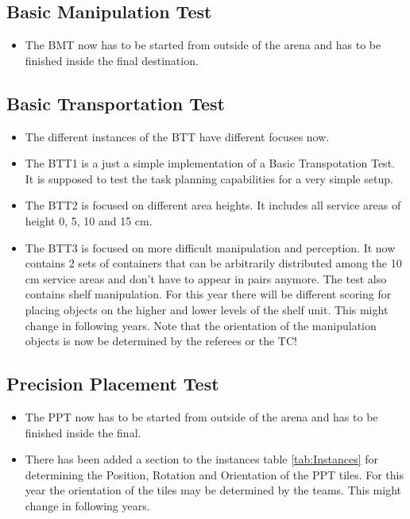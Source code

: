 \subsection{Basic Manipulation Test} 
\begin{itemize}
  \item The BMT now has to be started from outside of the arena and has to be finished inside the final destination.
\end{itemize}

\subsection{Basic Transportation Test}\label{cl:BTT}
\begin{itemize}
  \item The different instances of the BTT have different focuses now.
  \item The BTT1 is a just a simple implementation of a Basic Transpotation Test. It is supposed to test the task planning capabilities for a very simple setup.
  \item The BTT2 is focused on different area heights. It includes all service areas of height 0, 5, 10 and 15 cm.
  \item The BTT3 is focused on more difficult manipulation and perception. It now contains 2 sets of containers that can be arbitrarily distributed among the 10 cm service areas and don't have to appear in pairs anymore. The test also contains shelf manipulation. For this year there will be different scoring for placing objects on the higher and lower levels of the shelf unit. This might change in following years. Note that the orientation of the manipulation objects is now be determined by the referees or the TC!
\end{itemize}

\subsection{Precision Placement Test}
\begin{itemize}
  \item The PPT now has to be started from outside of the arena and has to be finished inside the final.
  \item There has been added a section to the instances table \ref{tab:Instances} for determining the Position, Rotation and Orientation of the PPT tiles. For this year the orientation of the tiles may be determined by the teams. This might change in following years.
\end{itemize}

